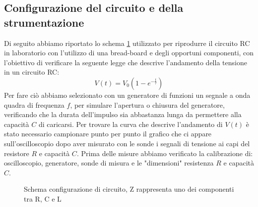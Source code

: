 \documentclass[letterpaper,12pt]{article}
\begin{document}
\subsection{Configurazione del circuito e della strumentazione}
Di seguito abbiamo riportato lo schema \ref{fig:config_circuito} utilizzato per riprodurre il circuito RC in laboratorio con l'utilizzo di una bread-board e degli opportuni componenti, con l'obiettivo di verificare la seguente legge che descrive l'andamento della tensione in un circuito RC:
\begin{equation}
\label{eq: Modello esponenziale}
    V(t) = V_0 \left(1  -e^{-\frac{t}{\tau}}\right) 
\end{equation}
 Per fare ciò abbiamo selezionato con un generatore di funzioni un segnale a onda quadra di frequenza $f$, per simulare l'apertura o chiusura del generatore, verificando che la durata dell'impulso sia abbastanza lunga da permettere alla capacità $C$ di caricarsi.
 Per trovare la curva che descrive l'andamento di $V(t)$ è stato necessario campionare punto per punto il grafico che ci appare sull'oscilloscopio dopo aver  misurato con le sonde i segnali di tensione ai capi del resistore $R$ e capacità $C$. Prima delle misure abbiamo verificato la calibrazione di: oscilloscopio, generatore, sonde di misura e le "dimensioni" resistenza $R$ e capacità $C$.
\begin{figure}[h!]
    \centering
    \caption{Schema configurazione di circuito, Z rappresenta uno dei componenti tra R, C e L}
    \label{fig:config_circuito}
\end{figure}
\end{document}
